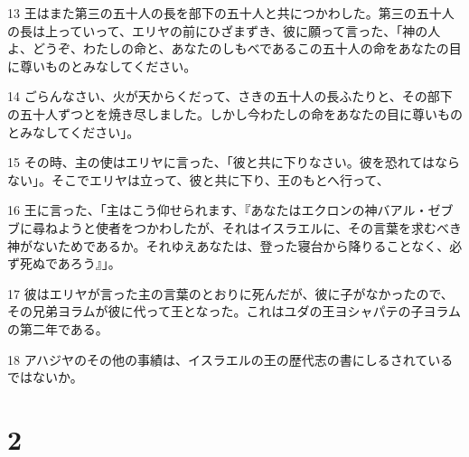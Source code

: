 \par 13 王はまた第三の五十人の長を部下の五十人と共につかわした。第三の五十人の長は上っていって、エリヤの前にひざまずき、彼に願って言った、「神の人よ、どうぞ、わたしの命と、あなたのしもべであるこの五十人の命をあなたの目に尊いものとみなしてください。
\par 14 ごらんなさい、火が天からくだって、さきの五十人の長ふたりと、その部下の五十人ずつとを焼き尽しました。しかし今わたしの命をあなたの目に尊いものとみなしてください」。
\par 15 その時、主の使はエリヤに言った、「彼と共に下りなさい。彼を恐れてはならない」。そこでエリヤは立って、彼と共に下り、王のもとへ行って、
\par 16 王に言った、「主はこう仰せられます、『あなたはエクロンの神バアル・ゼブブに尋ねようと使者をつかわしたが、それはイスラエルに、その言葉を求むべき神がないためであるか。それゆえあなたは、登った寝台から降りることなく、必ず死ぬであろう』」。
\par 17 彼はエリヤが言った主の言葉のとおりに死んだが、彼に子がなかったので、その兄弟ヨラムが彼に代って王となった。これはユダの王ヨシャパテの子ヨラムの第二年である。
\par 18 アハジヤのその他の事績は、イスラエルの王の歴代志の書にしるされているではないか。

\chapter{2}

